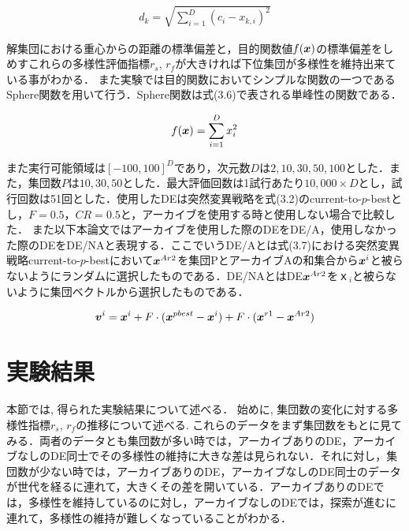 \documentclass[a4paper,11pt,oneside,openany]{jsbook}
\def\vector#1{\mbox{\boldmath $#1$}}
\begin{document}
\begin{eqnarray}
d_{k} = \sqrt{\sum_{i=1}^{D} (c_i - x_{k,i})^2}
\end{eqnarray}

解集団における重心からの距離の標準偏差と，目的関数値$f(\vector{x})$の標準偏差をしめすこれらの多様性評価指標$r_s$, $r_f$が大きければ下位集団が多様性を維持出来ている事がわかる．
また実験では目的関数においてシンプルな関数の一つであるSphere関数を用いて行う．Sphere関数は式(3.6)で表される単峰性の関数である．

\begin{eqnarray}
  f(\vector{x}) = \sum_{i=1}^D x_i^2
\end{eqnarray}

また実行可能領域は$[-100, 100]^D$であり，次元数$D$は$2,10,30,50,100$とした．また，集団数$P$は$10,30,50$とした．最大評価回数は1試行あたり$10,000 \times D$とし，試行回数は51回とした．使用したDEは突然変異戦略を式(3.2)のcurrent-to-$p$-bestとし，$F=0.5$，$CR=0.5$と，アーカイブを使用する時と使用しない場合で比較した．
また以下本論文ではアーカイブを使用した際のDEをDE/A，使用しなかった際のDEをDE/NAと表現する．ここでいうDE/Aとは式(3.7)における突然変異戦略current-to-$p$-bestにおいて$\vector{x}^{Ar2}$を集団PとアーカイブAの和集合から${\vector{x}^i}$と被らないようにランダムに選択したものである．DE/NAとはDE$\vector{x}^{Ar2}$を$ｘ_{i}$と被らないように集団ベクトルから選択したものである．

\begin{eqnarray}
\vector{v}^{i} = \vector{x}^{i} + F\cdot(\vector{x}^{pbest} - \vector{x}^{i}) + F\cdot(\vector{x}^{r1} - \vector{x}^{Ar2})
\end{eqnarray}




\section{実験結果}
本節では, 得られた実験結果について述べる．
始めに, 集団数の変化に対する多様性指標$r_s$, $r_f$の推移について述べる.
これらのデータをまず集団数をもとに見てみる．両者のデータとも集団数が多い時では，アーカイブありのDE，アーカイブなしのDE同士でその多様性の維持に大きな差は見られない．それに対し，集団数が少ない時では，アーカイブありのDE，アーカイブなしのDE同士のデータが世代を経るに連れて，大きくその差を開いている．アーカイブありのDEでは，多様性を維持しているのに対し，アーカイブなしのDEでは，探索が進むに連れて，多様性の維持が難しくなっていることがわかる．
\end{document}
